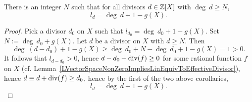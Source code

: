     \begin{corollary}\label{GenusIsObservedForAllLargeDivisors}
        There is an integer $N$ such that for all divisors $d\in \mathbb{Z}[X]$ with $\deg \ d \geq N$, 
        $$
            l_d = \deg \ d + 1 - g(X).
        $$
    \end{corollary}
    \begin{proof}
        Pick a divisor $d_0$ on $X$ such that $l_{d_0} = \deg \ d_0 +1 -g(X)$. Set $N:= \deg \ d_0 + g(X)$. Let $d$ be a divisor on $X$ with $d\geq N$. Then 
        $$
            \deg \ (d-d_0)+1-g(X) \geq \deg \ d_0 + N-\deg \ d_0 + 1 -g(X) = 1 >0. 
        $$ 
        It follows that $l_{d-d_0}>0$, hence $d-d_0+\mathrm{div}(f)\geq 0$ for some rational function $f$ on $X$ (cf. Lemma~\ref{LVectorSpaceNonZeroImpliesLinEquivToEffectiveDivisor}), hence $d\equiv d+\mathrm{div}(f) \geq d_0$, hence by the first of the two above corollaries, 
        $$
            l_{d} = \deg \ d +1 -g(X).
        $$
    \end{proof}
    
